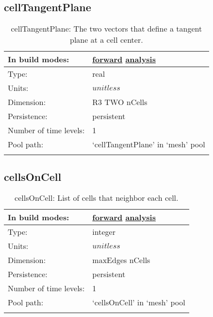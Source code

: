 \subsection[cellTangentPlane]{cellTangentPlane}
\label{subsec:var_sec_mesh_cellTangentPlane}
\begin{center}
\begin{longtable}{| p{2.0in} | p{4.0in} |}
        \hline 
        In build modes: & \hyperref[subsec:forward_var_tab_mesh]{forward} \hyperref[subsec:analysis_var_tab_mesh]{analysis} \\
        \hline 
        Type: & real \\
        \hline 
        Units: & $unitless$ \\
        \hline 
        Dimension: & R3 TWO nCells \\
        \hline 
        Persistence: & persistent \\
        \hline 
        Number of time levels: & 1 \\
        \hline 
            Pool path: & `cellTangentPlane' in `mesh' pool \\
		 \hline 
    \caption{cellTangentPlane: The two vectors that define a tangent plane at a cell center.}
\end{longtable}
\end{center}
\subsection[cellsOnCell]{cellsOnCell}
\label{subsec:var_sec_mesh_cellsOnCell}
\begin{center}
\begin{longtable}{| p{2.0in} | p{4.0in} |}
        \hline 
        In build modes: & \hyperref[subsec:forward_var_tab_mesh]{forward} \hyperref[subsec:analysis_var_tab_mesh]{analysis} \\
        \hline 
        Type: & integer \\
        \hline 
        Units: & $unitless$ \\
        \hline 
        Dimension: & maxEdges nCells \\
        \hline 
        Persistence: & persistent \\
        \hline 
        Number of time levels: & 1 \\
        \hline 
            Pool path: & `cellsOnCell' in `mesh' pool \\
		 \hline 
    \caption{cellsOnCell: List of cells that neighbor each cell.}
\end{longtable}
\end{center}

